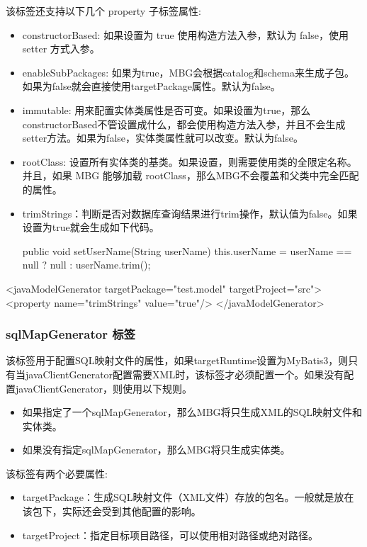 该标签还支持以下几个 property 子标签属性:
\begin{itemize}
    \item constructorBased: 如果设置为 true 使用构造方法入参，默认为 false，使用 setter 方式入参。
    \item enableSubPackages: 如果为true，MBG会根据catalog和schema来生成子包。如果为false就会直接使用targetPackage属性。默认为false。
    \item immutable: 用来配置实体类属性是否可变。如果设置为true，那么constructorBased不管设置成什么，都会使用构造方法入参，并且不会生成setter方法。如果为false，实体类属性就可以改变。默认为false。
    \item rootClass: 设置所有实体类的基类。如果设置，则需要使用类的全限定名称。并且，如果 MBG 能够加载 rootClass，那么MBG不会覆盖和父类中完全匹配的属性。
    \item trimStrings：判断是否对数据库查询结果进行trim操作，默认值为false。如果设置为true就会生成如下代码。
\begin{Java}
public void setUserName(String userName) {
    this.userName = userName == null ? null : userName.trim();
}
\end{Java}
\end{itemize}

\begin{xml}
<javaModelGenerator targetPackage="test.model" targetProject="src\main\java">
    <property name="trimStrings" value="true"/>
</javaModelGenerator>
\end{xml}

\subsubsection*{sqlMapGenerator 标签}

该标签用于配置SQL映射文件的属性，如果targetRuntime设置为MyBatis3，则只有当javaClientGenerator配置需要XML时，该标签才必须配置一个。如果没有配置javaClientGenerator，则使用以下规则。

\begin{itemize}
    \item 如果指定了一个sqlMapGenerator，那么MBG将只生成XML的SQL映射文件和实体类。
    \item 如果没有指定sqlMapGenerator，那么MBG将只生成实体类。
\end{itemize}

该标签有两个必要属性:
\begin{itemize}
    \item targetPackage：生成SQL映射文件（XML文件）存放的包名。一般就是放在该包下，实际还会受到其他配置的影响。
    \item targetProject：指定目标项目路径，可以使用相对路径或绝对路径。
\end{itemize}

